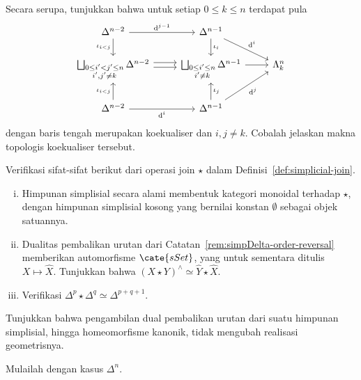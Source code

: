\begin{Exercises}
	Secara serupa, tunjukkan bahwa untuk setiap $0\leq k\leq n$ terdapat pula
	\[\begin{tikzcd}
		\Delta^{n-2} \arrow[d, "{\iota_{i < j}}"'] \arrow[r, "{\mathrm{d}^{j-1}}"] & \Delta^{n-1} \arrow[d, "\iota_i"] \arrow[rd, "{\mathrm{d}^i}"] & \\
		\bigsqcup_{\substack{0 \leq i' < j' \leq n \\ i', j' \neq k}} \Delta^{n-2} \arrow[shift left, r] \arrow[shift right, r] & \bigsqcup_{\substack{0 \leq i' \leq n \\ i' \neq k}} \Delta^{n-1} \arrow[r] & \Lambda^n_k \\
		\Delta^{n-2} \arrow[u, "{\iota_{i < j}}"] \arrow[r, "{\mathrm{d}^i}"'] & \Delta^{n-1} \arrow[u, "\iota_j"'] \arrow[ru, "{\mathrm{d}^j}"'] &
	\end{tikzcd}\]
	dengan baris tengah merupakan koekualiser dan $i,j\neq k$. Cobalah
	jelaskan makna topologis koekualiser tersebut.

	\item Verifikasi sifat-sifat berikut dari operasi join $\star$ dalam
	Definisi~\ref{def:simplicial-join}.
	\begin{enumerate}[(i)]
		\item Himpunan simplisial secara alami membentuk kategori monoidal
		terhadap $\star$, dengan himpunan simplisial kosong yang bernilai konstan
		$\emptyset$ sebagai objek satuannya.
		\item Dualitas pembalikan urutan dari
		Catatan~\ref{rem:simpDelta-order-reversal} memberikan automorfisme
		$\cate{sSet}$, yang untuk sementara ditulis $X\mapsto\hat{X}$. Tunjukkan
		bahwa $(X\star Y)^{\wedge}\simeq\hat{Y}\star\hat{X}$.
		\item Verifikasi
		$\Delta^p\star\Delta^q\simeq\Delta^{p+q+1}$.
	\end{enumerate}

	\item Tunjukkan bahwa pengambilan dual pembalikan urutan dari suatu
	himpunan simplisial, hingga homeomorfisme kanonik, tidak mengubah realisasi
	geometrisnya.
	\begin{hint}
		Mulailah dengan kasus $\Delta^n$.
	\end{hint}


\end{Exercises}
